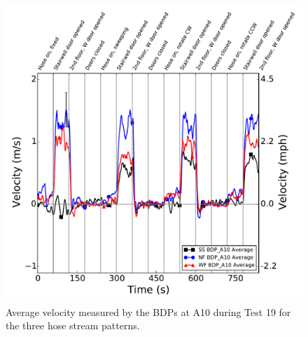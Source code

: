 \documentclass[12pt,oneside]{book}
\begin{document}
\begin{figure}[!ht]
	\includegraphics[width=6in]{../Figures/Plots/Test_19_West_063014_BDP_A10_stream_avgs}
	\caption{Average velocity measured by the BDPs at A10 during Test 19 for the three hose stream patterns.}
	\label{fig:Test_19_BDP_A10_Avg_All}
\end{figure}

\clearpage
\end{document}
